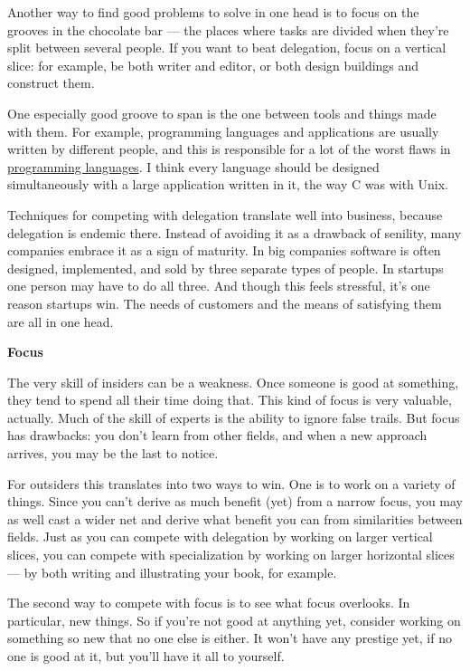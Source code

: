 \documentclass[12pt]{book}
\begin{document}
Another way to find good problems to solve in one head is to focus on
the grooves in the chocolate bar --- the places where tasks are divided
when they're split between several people. If you want to beat
delegation, focus on a vertical slice: for example, be both writer and
editor, or both design buildings and construct them.

One especially good groove to span is the one between tools and things
made with them. For example, programming languages and applications are
usually written by different people, and this is responsible for a lot
of the worst flaws in \href{hundred.html}{programming languages}. I
think every language should be designed simultaneously with a large
application written in it, the way C was with Unix.

Techniques for competing with delegation translate well into business,
because delegation is endemic there. Instead of avoiding it as a
drawback of senility, many companies embrace it as a sign of maturity.
In big companies software is often designed, implemented, and sold by
three separate types of people. In startups one person may have to do
all three. And though this feels stressful, it's one reason startups
win. The needs of customers and the means of satisfying them are all in
one head.

\textbf{Focus}

The very skill of insiders can be a weakness. Once someone is good at
something, they tend to spend all their time doing that. This kind of
focus is very valuable, actually. Much of the skill of experts is the
ability to ignore false trails. But focus has drawbacks: you don't learn
from other fields, and when a new approach arrives, you may be the last
to notice.

For outsiders this translates into two ways to win. One is to work on a
variety of things. Since you can't derive as much benefit (yet) from a
narrow focus, you may as well cast a wider net and derive what benefit
you can from similarities between fields. Just as you can compete with
delegation by working on larger vertical slices, you can compete with
specialization by working on larger horizontal slices --- by both
writing and illustrating your book, for example.

The second way to compete with focus is to see what focus overlooks. In
particular, new things. So if you're not good at anything yet, consider
working on something so new that no one else is either. It won't have
any prestige yet, if no one is good at it, but you'll have it all to
yourself.
\end{document}
